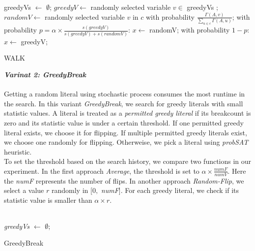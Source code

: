 \documentclass[12pt,a4paper,twoside]{scrartcl}
\numberwithin{equation}{section}
\begin{document}
\begin{algorithm}[H]
 greedyVs $\leftarrow$ $\emptyset$;\;
  $greedyV \leftarrow$   randomly selected variable $v \in$ greedyVs  ; \;
  $randomV \leftarrow$ randomly selected  variable $v$ in $c$ with probability $\frac{\Gamma(A,v)}{\sum_{u \in c}\Gamma(A,u)}$;  \;
  with probability $p = \alpha \times \frac{s(greedyV)}{s(greedyV)+s(randomV)}$: $x\leftarrow$ randomV;\;
    with probability $1-p$: $x\leftarrow$ greedyV;\;
\caption{WALK}
\end{algorithm} 
\clearpage
 \emph{\textbf{Varinat 2: GreedyBreak}}\\
\\ Getting a random literal using stochastic process consumes the most runtime in the search. In this variant \emph{GreedyBreak}, we search for greedy literals with small statistic values. A literal is treated as  a \emph{permitted greedy literal} if its breakcount is zero and its statistic value is under a certain threshold. If one permitted greedy literal exists, we choose it for flipping. If multiple permitted greedy literals exist, we choose one randomly for flipping. Otherweise, we pick a literal using \emph{probSAT} heuristic.\\ To set the threshold based on the search history, we compare two functions in our experiment. In the first approach \emph{Average}, the threshold is set to $\alpha \times \frac{numF}{numV}$. Here the \emph{numF} represents the number of flips. In another approach \emph{Random-Flip}, we select  a value $r $ randomly in $[0,$  \emph{numF}]. For each greedy literal, we check if its statistic value is smaller than $\alpha \times r$. \\
\\
\begin{algorithm}[H]
  \emph{greedyVs} $\leftarrow$ $\emptyset$;\;
  \;
\caption{GreedyBreak}
\end{algorithm} 
\end{document}
